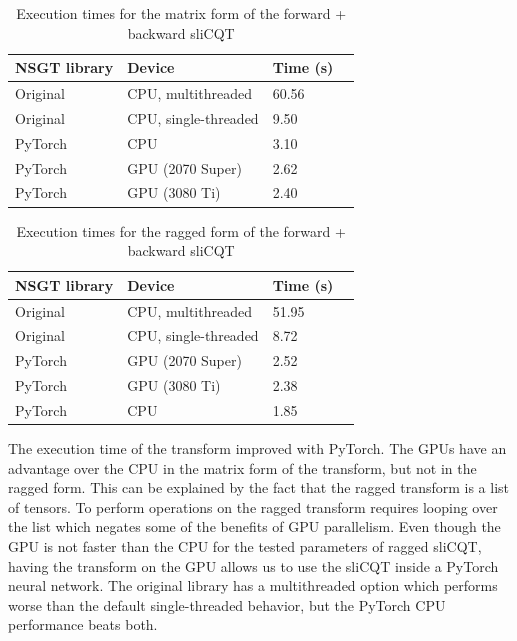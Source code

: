 \documentclass[report.tex]{subfiles}
\begin{document}
\begin{table}[ht]
	\centering
	\caption{Execution times for the matrix form of the forward + backward sliCQT}
	\label{table:nsgttorchresultsmatrix}
	\begin{tabular}{ |l|l|l|l| }
	 \hline
		NSGT library & Device & Time (s) \\
	 \hline
	 \hline
		Original & CPU, multithreaded & 60.56  \\
	 \hline
		Original & CPU, single-threaded & 9.50  \\
	 \hline
		PyTorch & CPU & 3.10  \\
	 \hline
		PyTorch & GPU (2070 Super) & 2.62 \\
	 \hline
		PyTorch & GPU (3080 Ti) &  2.40 \\
	 \hline
\end{tabular}
\end{table}

\begin{table}[ht]
	\centering
	\caption{Execution times for the ragged form of the forward + backward sliCQT}
	\label{table:nsgttorchresultsragged}
	\begin{tabular}{ |l|l|l|l| }
	 \hline
		NSGT library & Device & Time (s) \\
	 \hline
	 \hline
		Original & CPU, multithreaded & 51.95  \\
	 \hline
		Original & CPU, single-threaded & 8.72  \\
	 \hline
		PyTorch & GPU (2070 Super) & 2.52 \\
	 \hline
		PyTorch & GPU (3080 Ti) &  2.38 \\
	 \hline
		PyTorch & CPU & 1.85  \\
	 \hline
\end{tabular}
\end{table}

The execution time of the transform improved with PyTorch. The GPUs have an advantage over the CPU in the matrix form of the transform, but not in the ragged form. This can be explained by the fact that the ragged transform is a list of tensors. To perform operations on the ragged transform requires looping over the list which negates some of the benefits of GPU parallelism. Even though the GPU is not faster than the CPU for the tested parameters of ragged sliCQT, having the transform on the GPU allows us to use the sliCQT inside a PyTorch neural network. The original library has a multithreaded option which performs worse than the default single-threaded behavior, but the PyTorch CPU performance beats both.
\end{document}
